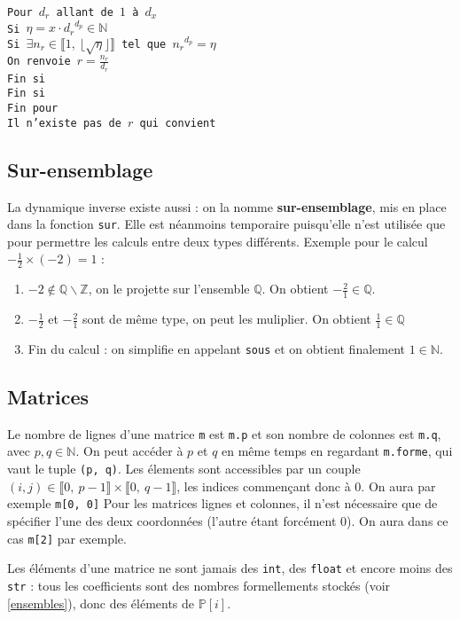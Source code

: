 \documentclass[french]{article}
\newcommand{\p}{\texttt} %
\newcommand{\tab}{\hspace*{5mm}}
\newcommand{\floor}[1]{\lfloor #1 \rfloor} %
\newcommand{\entiers}[2]{\llbracket #1,\ #2\rrbracket} %
\begin{document}
\noindent\texttt{Pour $d_r$ allant de $1$ à $d_x$ \\
\tab Si $\eta = x \cdot {d_r}^{d_p} \in \mathbb{N}$ \\
\tab\tab Si $\exists n_r \in \entiers{1}{\floor{\sqrt{\eta}}}$ tel que ${n_r}^{d_p} = \eta$ \\
\tab\tab\tab On renvoie $r = \frac{n_r}{d_r}$ \\
\tab\tab Fin si \\
\tab Fin si \\
Fin pour\\
Il n'existe pas de $r$ qui convient}


\subsection{Sur-ensemblage}

La dynamique inverse existe aussi : on la nomme \textbf{sur-ensemblage}, mis en place dans la fonction \p{sur}. Elle est néanmoins temporaire puisqu'elle n'est utilisée que pour permettre les calculs entre deux types différents.
Exemple pour le calcul $-\frac{1}{2} \times (-2) = 1$ :
\begin{enumerate}
  \item $-2 \not\in \mathbb{Q} \backslash \mathbb{Z} $, on le projette sur l'ensemble $\mathbb{Q}$. On obtient $-\frac{2}{1} \in \mathbb{Q}$.
  \item $-\frac{1}{2}$ et $-\frac{2}{1}$ sont de même type, on peut les muliplier. On obtient $\frac{1}{1} \in \mathbb{Q}$
  \item Fin du calcul : on simplifie en appelant \p{sous} et on obtient finalement $1 \in \mathbb{N}$.
\end{enumerate}

\subsection{Matrices}

Le nombre de lignes d'une matrice \p{m} est \p{m.p} et son nombre de colonnes est \p{m.q}, avec $p, q \in \mathbb{N}$. On peut accéder à $p$ et $q$ en même temps en regardant \p{m.forme}, qui vaut le tuple \p{(p, q)}. Les élements sont accessibles par un couple $(i, j) \in \entiers{0}{p -1} \times \entiers{0}{q -1}$, les indices commençant donc à 0. On aura par exemple \p{m[0, 0]} Pour les matrices lignes et colonnes, il n'est nécessaire que de spécifier l'une des deux coordonnées (l'autre étant forcément 0). On aura dans ce cas \p{m[2]} par exemple.

Les éléments d'une matrice ne sont jamais des \p{int}, des \p{float} et encore moins des \p{str} : tous les coefficients sont des nombres formellements stockés (voir \ref{ensembles}), donc des éléments de $\mathbb{P}[i]$.
\end{document}
